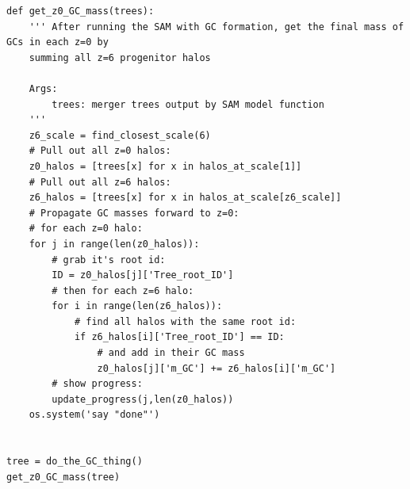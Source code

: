 \documentclass[onecolumn]{aastex62}
\begin{document}
\begin{verbatim}
def get_z0_GC_mass(trees):   
    ''' After running the SAM with GC formation, get the final mass of GCs in each z=0 by 
    summing all z=6 progenitor halos

    Args:
        trees: merger trees output by SAM model function
    '''
    z6_scale = find_closest_scale(6)
    # Pull out all z=0 halos:
    z0_halos = [trees[x] for x in halos_at_scale[1]]
    # Pull out all z=6 halos:
    z6_halos = [trees[x] for x in halos_at_scale[z6_scale]]
    # Propagate GC masses forward to z=0:
    # for each z=0 halo:
    for j in range(len(z0_halos)):
        # grab it's root id:
        ID = z0_halos[j]['Tree_root_ID']
        # then for each z=6 halo:
        for i in range(len(z6_halos)):
            # find all halos with the same root id:
            if z6_halos[i]['Tree_root_ID'] == ID:
                # and add in their GC mass
                z0_halos[j]['m_GC'] += z6_halos[i]['m_GC']
        # show progress:
        update_progress(j,len(z0_halos))
    os.system('say "done"')


tree = do_the_GC_thing()
get_z0_GC_mass(tree)
\end{verbatim}
\end{document}
